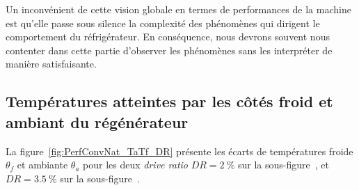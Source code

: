 Un inconvénient de cette vision globale en termes de performances de la machine est qu'elle passe sous silence la complexité des phénomènes qui dirigent le comportement du réfrigérateur. En conséquence, nous devrons souvent nous contenter dans cette partie d'observer les phénomènes sans les interpréter de manière satisfaisante.


\subsection{Températures atteintes par les côtés froid et ambiant du régénérateur}
La figure~\ref{fig:PerfConvNat_TaTf_DR} présente les écarts de températures froide $\theta_f$ et ambiante $\theta_a$ pour les deux \textit{drive ratio} $DR=\qty{2}{\percent}$ sur la sous-figure~, et $DR=\qty{3.5}{\percent}$ sur la sous-figure~.\medskip


